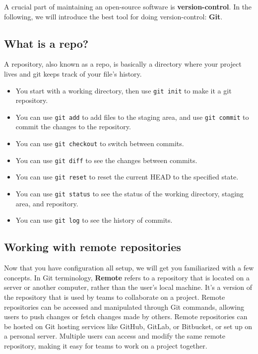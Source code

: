 \documentclass[
  notoc %
]{tufte-book}
\providecommand{\tightlist}{%
  \setlength{\itemsep}{0pt}\setlength{\parskip}{0pt}
}
\newcommand{\passthrough}[1]{#1}
\begin{document}
A crucial part of maintaining an open-source software is
\textbf{version-control}. In the following, we will introduce the best
tool for doing version-control: \textbf{Git}.

\hypertarget{what-is-a-repo}{%
\subsection{What is a repo?}\label{what-is-a-repo}}

A repository, also known as a repo, is basically a directory where your
project lives and git keeps track of your file's history.

\begin{itemize}
\tightlist
\item
  You start with a working directory, then use
  \passthrough{\lstinline!git init!} to make it a git repository.
\item
  You can use \passthrough{\lstinline!git add!} to add files to the
  staging area, and use \passthrough{\lstinline!git commit!} to commit
  the changes to the repository.
\item
  You can use \passthrough{\lstinline!git checkout!} to switch between
  commits.
\item
  You can use \passthrough{\lstinline!git diff!} to see the changes
  between commits.
\item
  You can use \passthrough{\lstinline!git reset!} to reset the current
  HEAD to the specified state.
\item
  You can use \passthrough{\lstinline!git status!} to see the status of
  the working directory, staging area, and repository.
\item
  You can use \passthrough{\lstinline!git log!} to see the history of
  commits.
\end{itemize}

\hypertarget{working-with-remote-repositories}{%
\subsection{Working with remote
repositories}\label{working-with-remote-repositories}}

Now that you have configuration all setup, we will get you familiarized
with a few concepts. In Git terminology, \textbf{Remote} refers to a
repository that is located on a server or another computer, rather than
the user's local machine. It's a version of the repository that is used
by teams to collaborate on a project. Remote repositories can be
accessed and manipulated through Git commands, allowing users to push
changes or fetch changes made by others. Remote repositories can be
hosted on Git hosting services like GitHub, GitLab, or Bitbucket, or set
up on a personal server. Multiple users can access and modify the same
remote repository, making it easy for teams to work on a project
together.
\end{document}
